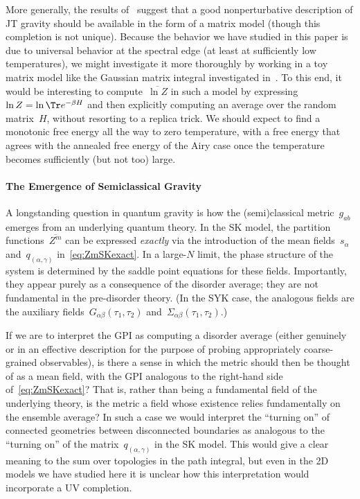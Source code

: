 \documentclass[12pt]{article}
\begin{document}
More generally, the results of~\cite{SSS} suggest that a good nonperturbative description of JT gravity should be available in the form of a matrix model (though this completion is not unique).  Because the behavior we have studied in this paper is due to universal behavior at the spectral edge (at least at sufficiently low temperatures), we might investigate it more thoroughly by working in a toy matrix model like the Gaussian matrix integral investigated in~\cite{Oku19}.  To this end, it would be interesting to compute~$\overline{\ln Z}$ in such a model by expressing~$\ln Z = \ln \Tr e^{-\beta H}$ and then explicitly computing an average over the random matrix~$H$, without resorting to a replica trick.  We should expect to find a monotonic free energy all the way to zero temperature, with a free energy that agrees with the annealed free energy of the Airy case once the temperature becomes sufficiently (but not too) large.


\paragraph{The Emergence of Semiclassical Gravity}  A longstanding question in quantum gravity is how the (semi)classical metric~$g_{ab}$ emerges from an underlying quantum theory.  In the SK model, the partition functions~$\overline{Z^m}$ can be expressed \textit{exactly} via the introduction of the mean fields~$s_\alpha$ and~$q_{(\alpha,\gamma)}$ in~\eqref{eq:ZmSKexact}.  In a large-$N$ limit, the phase structure of the system is determined by the saddle point equations for these fields.  Importantly, they appear purely as a consequence of the disorder average; they are not fundamental in the pre-disorder theory.  (In the SYK case, the analogous fields are the auxiliary fields~$G_{\alpha\beta}(\tau_1,\tau_2)$ and~$\Sigma_{\alpha\beta}(\tau_1,\tau_2)$.)

If we are to interpret the GPI as computing a disorder average (either genuinely or in an effective description for the purpose of probing appropriately coarse-grained observables), is there a sense in which the metric should then be thought of as a mean field, with the GPI analogous to the right-hand side of~\eqref{eq:ZmSKexact}?  That is, rather than being a fundamental field of the underlying theory, is the metric a field whose existence relies fundamentally on the ensemble average?  In such a case we would interpret the ``turning on'' of connected geometries between disconnected boundaries as analogous to the ``turning on'' of the matrix~$q_{(\alpha,\gamma)}$ in the SK model.  This would give a clear meaning to the sum over topologies in the path integral, but even in the 2D models we have studied here it is unclear how this interpretation would incorporate a UV completion.
\end{document}
